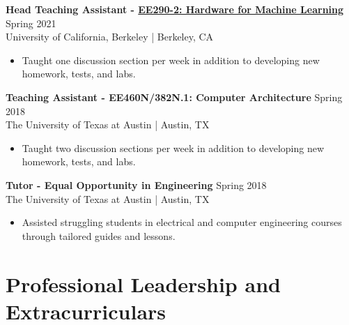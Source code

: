 \documentclass[line]{res}
\begin{document}
\begin{resume}
\textbf{Head Teaching Assistant - \href{https://inst.eecs.berkeley.edu/~ee290-2/sp21}{EE290-2: Hardware for Machine Learning}} \hfill Spring 2021
\\
University of California, Berkeley | Berkeley, CA
\\
\vspace{-3mm}
\begin{itemize}
\item Taught one discussion section per week in addition to developing new homework, tests, and labs.
\end{itemize}

\textbf{Teaching Assistant - EE460N/382N.1: Computer Architecture} \hfill Spring 2018
\\
The University of Texas at Austin | Austin, TX
\\
\vspace{-3mm}
\begin{itemize}
\item Taught two discussion sections per week in addition to developing new homework, tests, and labs.
\end{itemize}

\textbf{Tutor - Equal Opportunity in Engineering} \hfill Spring 2018
\\
The University of Texas at Austin | Austin, TX
\\
\vspace{-3mm}
\begin{itemize}
\item Assisted struggling students in electrical and computer engineering courses through tailored guides and lessons.
\end{itemize}

\section{\Large{Professional Leadership and Extracurriculars}}
\label{sec:profleadershipmembership}
\vspace{2mm}


\end{resume}
\end{document}
